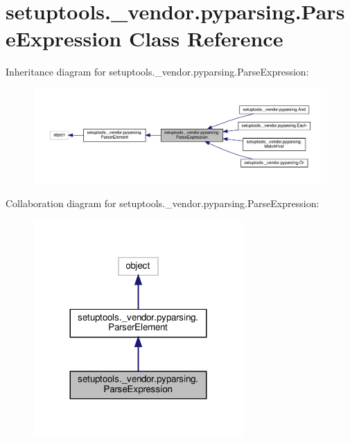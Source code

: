 \hypertarget{classsetuptools_1_1__vendor_1_1pyparsing_1_1ParseExpression}{}\section{setuptools.\+\_\+vendor.\+pyparsing.\+Parse\+Expression Class Reference}
\label{classsetuptools_1_1__vendor_1_1pyparsing_1_1ParseExpression}


Inheritance diagram for setuptools.\+\_\+vendor.\+pyparsing.\+Parse\+Expression\+:
\nopagebreak
\begin{figure}[H]
\begin{center}
\leavevmode
\includegraphics[width=350pt]{classsetuptools_1_1__vendor_1_1pyparsing_1_1ParseExpression__inherit__graph}
\end{center}
\end{figure}


Collaboration diagram for setuptools.\+\_\+vendor.\+pyparsing.\+Parse\+Expression\+:
\nopagebreak
\begin{figure}[H]
\begin{center}
\leavevmode
\includegraphics[width=227pt]{classsetuptools_1_1__vendor_1_1pyparsing_1_1ParseExpression__coll__graph}
\end{center}
\end{figure}

